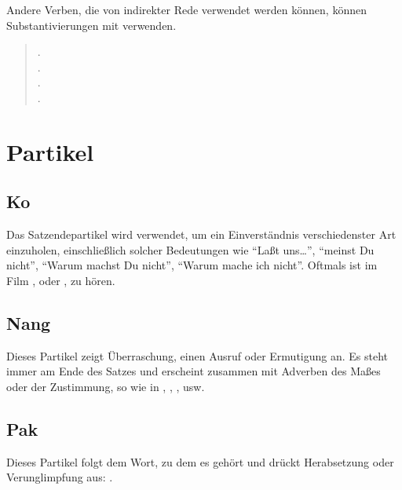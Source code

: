 \subsubsection{} Andere Verben, die von indirekter Rede verwendet werden k\"onnen,
k\"onnen Substantivierungen mit  verwenden.

\begin{quotation}
\noindent{}.\\
\indent{}. \\
\noindent{}. \\
\indent{}.
\end{quotation}


\section{Partikel}

\subsection{Ko} Das Satzendepartikel  wird verwendet, um ein Einverst\"andnis
verschiedenster Art einzuholen, einschlie\ss{}lich solcher Bedeutungen wie "`La\ss{}t
uns\dots"', "`meinst Du nicht"', "`Warum machst Du nicht"', "`Warum mache ich nicht"'.
Oftmals ist im Film ,  oder ,
 zu h\"oren.\label{syn:particle:ko}

\subsection{Nang} Dieses Partikel zeigt \"Uberraschung, einen Ausruf oder Ermutigung an.
Es steht immer am Ende des Satzes und erscheint zusammen mit Adverben des Ma\ss{}es oder
der Zustimmung, so wie in , , , usw.
 
 

\subsection{Pak} Dieses Partikel folgt dem Wort, zu dem es geh\"ort und dr\"uckt
Herabsetzung oder Verunglimpfung aus:  .

